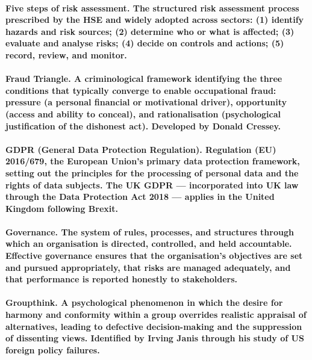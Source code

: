 \paragraph{\textbf{Five steps of risk assessment}. The structured risk assessment process prescribed by the HSE and widely adopted across sectors: (1) identify hazards and risk sources; (2) determine who or what is affected; (3) evaluate and analyse risks; (4) decide on controls and actions; (5) record, review, and monitor.}

\paragraph{\textbf{Fraud Triangle}. A criminological framework identifying the three conditions that typically converge to enable occupational fraud: pressure (a personal financial or motivational driver), opportunity (access and ability to conceal), and rationalisation (psychological justification of the dishonest act). Developed by Donald Cressey.}

\paragraph{\textbf{GDPR (General Data Protection Regulation)}. Regulation (EU) 2016/679, the European Union's primary data protection framework, setting out the principles for the processing of personal data and the rights of data subjects. The UK GDPR — incorporated into UK law through the Data Protection Act 2018 — applies in the United Kingdom following Brexit.}

\paragraph{\textbf{Governance}. The system of rules, processes, and structures through which an organisation is directed, controlled, and held accountable. Effective governance ensures that the organisation's objectives are set and pursued appropriately, that risks are managed adequately, and that performance is reported honestly to stakeholders.}

\paragraph{\textbf{Groupthink}. A psychological phenomenon in which the desire for harmony and conformity within a group overrides realistic appraisal of alternatives, leading to defective decision-making and the suppression of dissenting views. Identified by Irving Janis through his study of US foreign policy failures.}

